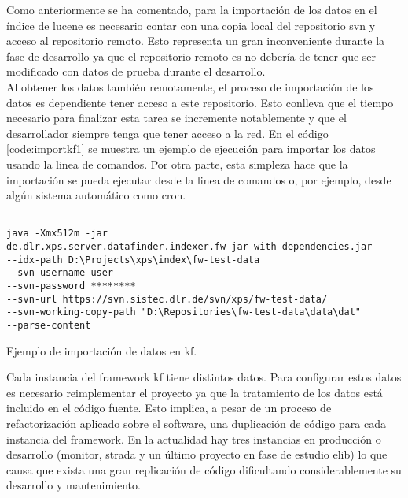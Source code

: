 \begin{itemize}
Como anteriormente se ha comentado, para la importación de los datos en el índice de \gls{lucene} es necesario contar con una copia local del repositorio \gls{svn} y acceso al repositorio remoto. Esto representa un gran inconveniente durante la fase de desarrollo ya que el repositorio remoto es no debería de tener que ser modificado con datos de prueba durante el desarrollo.\\

Al obtener los datos también remotamente, el proceso de importación de los datos es dependiente tener acceso a este repositorio. Esto conlleva que el tiempo necesario para finalizar esta tarea se incremente notablemente y que el desarrollador siempre tenga que tener acceso a la red. En el código \ref{code:importkf1} se muestra un ejemplo de ejecución para importar los datos usando la linea de comandos. Por otra parte, esta simpleza hace que la importación se pueda ejecutar desde la linea de comandos o, por ejemplo, desde algún sistema automático como \gls{cron}.

\begin{listing}
\begin{verbatim}
               
java -Xmx512m -jar
de.dlr.xps.server.datafinder.indexer.fw-jar-with-dependencies.jar 
--idx-path D:\Projects\xps\index\fw-test-data
--svn-username user 
--svn-password ********
--svn-url https://svn.sistec.dlr.de/svn/xps/fw-test-data/ 
--svn-working-copy-path "D:\Repositories\fw-test-data\data\dat" 
--parse-content

	\end{verbatim}
	\caption{Ejemplo de importación de datos en \gls{kf}.}
	\label{code:importkf1}
\end{listing}


Cada instancia del \gls{framework} \gls{kf} tiene distintos datos. Para configurar estos datos es necesario reimplementar el proyecto ya que la tratamiento de los datos está incluido en el código fuente. Esto implica, a pesar de un proceso de refactorización aplicado sobre el \gls{software}, una duplicación de código para cada instancia del \gls{framework}. En la actualidad hay tres instancias en producción o desarrollo (\gls{monitor}, \gls{strada} y un último proyecto en fase de estudio \gls{elib}) lo que causa que exista una gran replicación de código dificultando considerablemente su desarrollo y mantenimiento.\\ 


\end{itemize}
